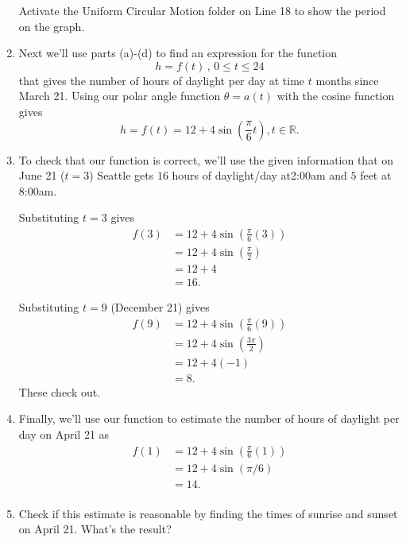 \documentclass{ximera}
\begin{document}
\begin{example}
\begin{enumerate}
Activate the Uniform Circular Motion folder on Line 18 to show the period on the graph.

\item Next we'll use parts (a)-(d) to find an expression for the function
\[
           h = f(t) \, , \, 0\leq t \leq 24
\]
that gives the number of hours of daylight per day at time $t$ months since March 21. Using our polar angle function $\theta = a(t)$ with the cosine function gives 
\[
   h  = f(t) = 12 + 4 \sin \left(  \frac{\pi}{6} t \right), t\in\mathbb{R} .
\]



\item To check that our function is correct, we'll use the given information that on June 21 ($t=3$) Seattle gets $16$ hours of daylight/day at2:00am and $5$ feet at 8:00am.

Substituting $t=3$ gives
\begin{align*}
   f(3)   & = 12 + 4 \sin \left(  \frac{\pi}{6} \left( 3 \right) \right) \\ 
           & = 12 + 4 \sin (\frac{\pi}{2})  \\ 
           & = 12 + 4 \\
           & = 16 .
\end{align*}

Substituting $t=9$ (December 21) gives 
\begin{align*}
   f(9)   & = 12 + 4 \sin \left(  \frac{\pi}{6} \left(9 \right) \right) \\ 
           & = 12 + 4 \sin \left( \frac{3\pi}{2} \right)  \\ 
           & = 12 + 4(-1) \\
           & = 8 .
\end{align*}
These check out.

\item Finally, we'll use our function to estimate the number of hours of daylight per day on April 21 as
\begin{align*}
   f(1)   & = 12 + 4 \sin \left(  \frac{\pi}{6} \left(1 \right) \right) \\ 
           & = 12 +4 \sin (\pi / 6)  \\ 
           &  = 14 . \\ 
         \end{align*}

\item Check if this estimate is reasonable by finding the times of sunrise and sunset on April 21. What's the result?
\begin{freeResponse}
\end{freeResponse}


\end{enumerate}
\end{example}
\end{document}
